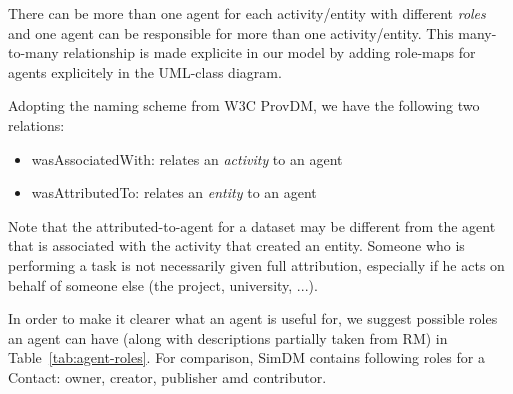 There can be more than one agent for each activity/entity with different \emph{roles} 
and one agent can be responsible for more than one activity/entity. This 
many-to-many relationship is made explicite in our model by adding role-maps 
for agents explicitely in the UML-class diagram.

Adopting the naming scheme from W3C ProvDM, we have the following two relations:

\begin{itemize}
\item wasAssociatedWith: relates an \emph{activity} to an agent
\item wasAttributedTo: relates an \emph{entity} to an agent
\end{itemize}

Note that the attributed-to-agent for a dataset may be different from the 
agent that is associated with the activity that created an entity. 
Someone who is performing a task is not necessarily given full attribution, 
especially if he acts on behalf of someone else (the project, university, ...).

In order to make it clearer what an agent is useful for, we suggest
possible roles an agent can have (along with descriptions partially taken from RM)
in Table~\ref{tab:agent-roles}. For comparison, SimDM contains following roles for 
a Contact: owner, creator, publisher amd  contributor.


